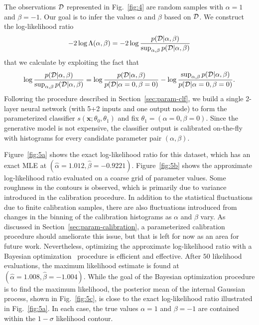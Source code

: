 \documentclass[12pt]{article}
\numberwithin{equation}{section}
\theoremstyle{plain}
\begin{document}
The observations ${\cal D}$ represented in Fig.~\ref{fig:4}
are random samples with $\alpha=1$ and $\beta=-1$.
Our goal is to infer the values $\alpha$ and $\beta$ based on ${\cal D}$.
We construct the log-likelihood ratio
\begin{equation}\label{eqn:obj-ex2}
    -2 \log \Lambda(\alpha, \beta ) = -2 \log \frac{p({\cal D} | \alpha, \beta)}{ \sup_{\alpha,\beta} p({\cal D} | \alpha, \beta) }
\end{equation}
that we calculate by exploiting the fact that
\begin{equation}\label{eqn:obj-ex2-expanded}
\log \frac{p({\cal D} | \alpha, \beta)}{ \sup_{\alpha,\beta} p({\cal D} | \alpha, \beta) } = \log \frac{p({\cal D} | \alpha, \beta)}{ p({\cal D} | \alpha=0, \beta=0) } - \log \frac{ \sup_{\alpha,\beta} p({\cal D} | \alpha, \beta) }{ p({\cal D} | \alpha=0, \beta=0)}.
\end{equation}
Following the procedure described in Section~\ref{sec:param-clf}, we
build a single 2-layer neural network (with 5+2 inputs and one output node) to form the parameterized classifier $s(\mathbf{x}; \theta_0, \theta_1)$ and fix $\theta_1=(\alpha=0, \beta=0)$.
Since the generative model is not expensive, the classifier output is calibrated
on-the-fly with histograms for  every candidate parameter pair $(\alpha,\beta)$.

Figure~\ref{fig:5a} shows the exact log-likelihood ratio for this dataset, which has an exact MLE at $(\hat \alpha=1.012, \hat \beta=-0.9221)$.
Figure~\ref{fig:5b} shows the approximate log-likelihood ratio evaluated on a coarse grid of parameter values. Some roughness in the contours is observed, which is primarily due to variance introduced in the calibration procedure. In addition to the statistical fluctuations due to finite calibration samples, there are also fluctuations introduced from changes in the binning of the calibration histograms as $\alpha$ and $\beta$ vary. As discussed in Section~\ref{sec:param-calibration}, a parameterized calibration
procedure should ameliorate this issue, but that is left for now as an area for future work.
Nevertheless, optimizing the approximate log-likelihood ratio with
a Bayesian optimization~\citep{brochu2010tutorial} procedure is efficient and effective.
After $50$ likelihood evaluations, the maximum likelihood estimate is found at $(\hat \alpha=1.008, \hat \beta=-1.004)$.
While the goal of the Bayesian optimization procedure is to find the maximum likelihood, the posterior mean of the
internal Gaussian process, shown in Fig.~\ref{fig:5c}, is close to the exact log-likelihood ratio illustrated in Fig.~\ref{fig:5a}.
In each case, the true values $\alpha=1$ and $\beta=-1$ are contained within the $1-\sigma$ likelihood contour.
\end{document}
